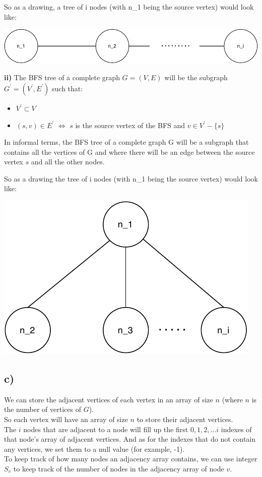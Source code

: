 \documentclass{article}
\begin{document}
So as a drawing, a tree of i nodes (with n\_1 being the source vertex) would look like:

\includegraphics[scale=0.7]{draw1.pdf}

\BlankLine
\textbf{ii)} The BFS tree of a complete graph $G = (V, E)$ will be the subgraph $G^{\prime} = (V^{\prime}, E^{\prime})$ such that:
\begin{itemize}
    \item $V^{\prime} \subset V$
    \item $(s, v) \in E^{\prime}$ $\iff$ $s$ is the source vertex of the BFS and $v \in V^{\prime}-\{s\}$
\end{itemize}

In informal terms, the BFS tree of a complete graph G will be a subgraph that contains all the vertices of G and where there will be an edge between the source vertex $s$ and all the other nodes.

So as a drawing the tree of i nodes (with n\_1 being the source vertex) would look like:

\includegraphics[scale=0.7]{draw2.pdf}

\subsection*{c)}
We can store the adjacent vertices of each vertex in an array of size $n$ (where $n$ is the number of vertices of $G$). \\
So each vertex will have an array of size $n$ to store their adjacent vertices.\\ 
The $i$ nodes that are adjacent to a node will fill up the first $0, 1, 2, \dots i$ indexes of that node's array of adjacent vertices.
And as for the indexes that do not contain any vertices, we set them to a null value (for example, -1).\\ 
To keep track of how many nodes an adjacency array contains, we can use integer $S_v$ to keep track of the number of nodes in the adjacency array of node $v$.
\end{document}
